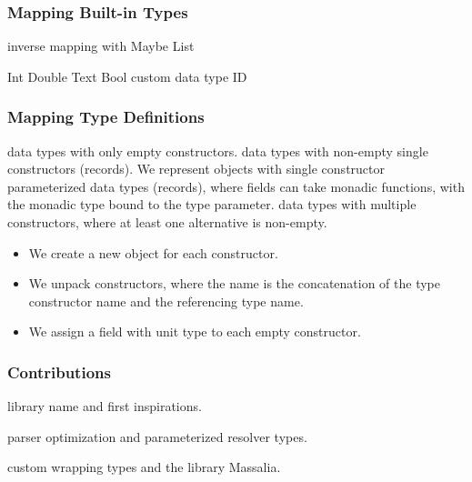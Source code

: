 \begin{frame}\frametitle{Mapping Built-in Types}
\begin{itemize}
  \begin{itemize}
     inverse mapping with Maybe
     List
  \end{itemize}
  \begin{itemize}
     Int
     Double
     Text
     Bool
     custom data type ID 
  \end{itemize}
\end{itemize}
\end{frame}

\begin{frame}\frametitle{Mapping Type Definitions}

\begin{itemize}
   data types with only empty constructors.
   data types with non-empty single constructors (records). 
   We represent objects with single constructor parameterized data types (records), where fields can take monadic functions, with the monadic type bound to the type parameter. 
   data types with multiple constructors, where at least one alternative is non-empty.
  \begin{itemize}
    \item We create a new object for each constructor.
    \item We unpack constructors, where the name is the concatenation of the type constructor name and the referencing type name. 
    \item We assign a field with unit type to each empty constructor.
  \end{itemize}
\end{itemize}

\end{frame}

\begin{frame}\frametitle{Contributions}

\begin{itemize} 
  
     library name and first inspirations.

     parser optimization and parameterized resolver types.
    
     custom wrapping types and the library Massalia.

\end{itemize}

\end{frame}